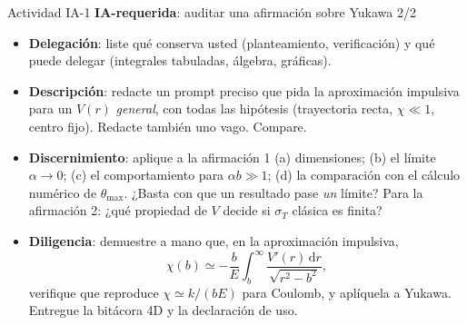 \documentclass[aspectratio=169]{beamer}
\newcommand{\tmax}{\theta_{\max}}
\newcommand{\dd}{\mathrm{d}}
\newcommand{\IArequerida}{\colorbox{green!20}{\scriptsize\textbf{IA-requerida}}}
\begin{document}
\begin{frame}{Actividad IA-1 \IArequerida: auditar una afirmación sobre Yukawa 2/2}
\begin{itemize}
  \item<1-> \textbf{Delegación}: liste qué conserva usted (planteamiento, verificación)
        y qué puede delegar (integrales tabuladas, álgebra, gráficas).
  \item<2-> \textbf{Descripción}: redacte un prompt preciso que pida la aproximación
        impulsiva para un $V(r)$ \emph{general}, con todas las hipótesis
        (trayectoria recta, $\chi\ll1$, centro fijo). Redacte también uno vago. Compare.
  \item<3-> \textbf{Discernimiento}: aplique a la afirmación 1
        (a) dimensiones; (b) el límite $\alpha\to0$; (c) el comportamiento para
        $\alpha b\gg1$; (d) la comparación con el cálculo numérico de $\tmax$.
        ¿Basta con que un resultado pase \emph{un} límite?
        Para la afirmación 2: ¿qué propiedad de $V$ decide si $\sigma_T$ clásica es finita?
  \item<4-> \textbf{Diligencia}: demuestre a mano que, en la aproximación impulsiva,
        \[
          \chi(b)\simeq-\frac{b}{E}\int_b^{\infty}\frac{V'(r)\,\dd r}{\sqrt{r^{2}-b^{2}}},
        \]
        verifique que reproduce $\chi\simeq k/(bE)$ para Coulomb, y aplíquela a Yukawa.
        Entregue la bitácora 4D y la declaración de uso.
\end{itemize}
\end{frame}
\end{document}
